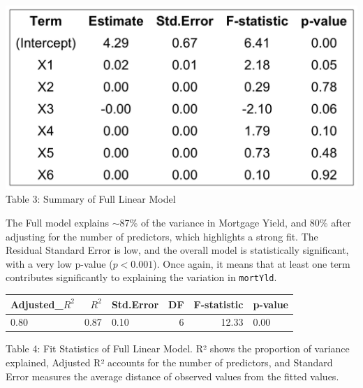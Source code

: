 \documentclass[
  12pt,
]{article}
\begin{document}
\begin{minipage}{0.42\textwidth}
\includegraphics[width=1\linewidth]{figures/full_model_summary_table.png}
\vspace{-0.1em}
{\fontsize{12}{14}\selectfont Table 3: Summary of Full Linear Model}
\end{minipage}
\hfill
\begin{minipage}{0.55\textwidth}
The Full model explains $\sim$87\% of the variance in Mortgage Yield, and 80\% after adjusting for the number of predictors, which highlights a strong fit. The Residual Standard Error is low, and the overall model is statistically significant, with a very low p-value ($p < 0.001$). Once again, it means that at least one term contributes significantly to explaining the variation in \texttt{mortYld}.
\end{minipage}

\noindent \vspace{-0.4em}

\begin{table}[!h]
\centering\begingroup\fontsize{8}{10}\selectfont

\begin{tabular}{lrlrrl}
\toprule
Adjusted\_$R^{2}$ & $R^2$ & Std.Error & DF & F-statistic & p-value\\
\midrule
0.80 & 0.87 & 0.10 & 6 & 12.33 & 0.00\\
\bottomrule
\end{tabular}
\endgroup{}
\end{table}

\noindent \fontsize{12}{14}\selectfont Table 4: Fit Statistics of Full
Linear Model. R² shows the proportion of variance explained, Adjusted R²
accounts for the number of predictors, and Standard Error measures the
average distance of observed values from the fitted values.

\par
\end{document}
